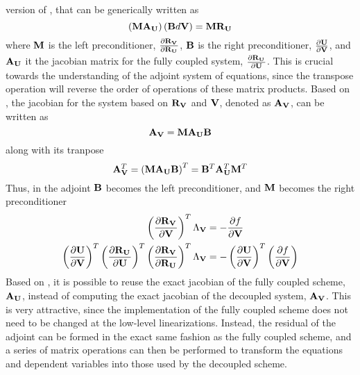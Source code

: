 version of , that can be generically written as
\begin{equation}
  \left(\mathbf M \mathbf A_{\mathbf U} \right) \left( \mathbf B d\mathbf V \right) = \mathbf M \mathbf R_{{\mathbf U}_{}}
  \label{generic-dc}
\end{equation}
where $\mathbf M$ is the left preconditioner, $\frac{\partial \mathbf R_{{\mathbf V}_{}}}{\partial \mathbf R_{{\mathbf U}_{}}}$, $\mathbf B$ is the right
preconditioner, $\frac{\partial \mathbf U}{\partial \mathbf V}$, and $\mathbf A_{\mathbf U}$ it the jacobian matrix for the
fully coupled system, $\frac{\partial \mathbf R_{{\mathbf U}_{}}}{\partial \mathbf U}$.  This is crucial towards the
understanding of the adjoint system of equations, since the transpose operation
will reverse the order of operations of these matrix products.  Based on
, the jacobian for the system based on $\mathbf R_{{\mathbf V}_{}}$ and $\mathbf V$,
denoted as $\mathbf A_{\mathbf V}$, can be written as
\begin{equation}
  \mathbf A_{\mathbf V} = \mathbf M \mathbf A_{\mathbf U} \mathbf B
  \label{adj-dc-generic}
\end{equation}
along with its tranpose
\begin{equation}
  \mathbf A_{\mathbf V}^{T}
   = \left( \mathbf M \mathbf A_{\mathbf U} \mathbf B \right)^{T}
   = \mathbf B^{T} \mathbf A_{\mathbf U}^{T} \mathbf M^{T}
  \label{adj-dc-generic-transpose}
\end{equation}
Thus, in the adjoint $\mathbf B$ becomes the left preconditioner, and $\mathbf M$ becomes
the right preconditioner
\begin{equation}
  \begin{aligned}
    \left(\frac{\partial \mathbf R_{{\mathbf V}_{}}}{\partial \mathbf V} \right)^{T} \Lambda_{\mathbf V} &= -\frac{\partial f}{\partial \mathbf V} \\
    \left( \frac{\partial \mathbf U}{\partial \mathbf V} \right)^{T}
    \left(\frac{\partial \mathbf R_{{\mathbf U}_{}}}{\partial \mathbf U} \right)^{T} 
    \left( \frac{\partial \mathbf R_{{\mathbf V}_{}}}{\partial \mathbf R_{{\mathbf U}_{}}} \right)^{T}
    \Lambda_{\mathbf V} 
    &= 
    - \left( \frac{\partial \mathbf U}{\partial \mathbf V} \right)^{T}
    \left( \frac{\partial f}{\partial \mathbf V} \right)
  \end{aligned}
  \label{adj-u-to-v}
\end{equation}
Based on , it is possible to reuse the exact jacobian of the
fully coupled scheme, $\mathbf A_{\mathbf U}$, instead of computing the exact jacobian of
the decoupled system, $\mathbf A_{\mathbf V}$.  This is very attractive, since the
implementation of the fully coupled scheme does not need to be changed at the
low-level linearizations.  Instead, the residual of the adjoint can be formed in
the exact same fashion as the fully coupled scheme, and a series of matrix
operations can then be performed to transform the equations and dependent
variables into those used by the decoupled scheme.

